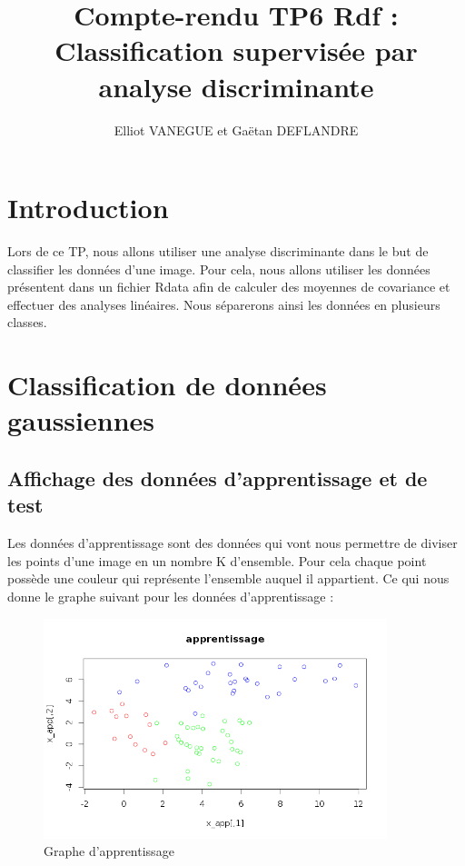 \documentclass[a4paper,11pt]{article}
\title{Compte-rendu TP6 Rdf : Classification supervisée par analyse discriminante}
\author{Elliot VANEGUE et Gaëtan DEFLANDRE}
\begin{document}


  \maketitle
  
  \mbox{}
  \newpage
  \clearpage
  
  \section*{Introduction}
  Lors de ce TP, nous allons utiliser une analyse discriminante dans
  le but de classifier les données d'une image. Pour cela, nous allons
  utiliser les données présentent dans un fichier Rdata afin de
  calculer des moyennes de covariance et effectuer des analyses
  linéaires. Nous séparerons ainsi les données en plusieurs classes.

  \section{Classification de données gaussiennes}
  \subsection{Affichage des données d'apprentissage et de test}
  Les données d'apprentissage sont des données qui vont nous permettre
  de diviser les points d'une image en un nombre K d'ensemble. Pour
  cela chaque point possède une couleur qui représente l'ensemble
  auquel il appartient.  Ce qui nous donne le graphe suivant pour les
  données d'apprentissage :
  
  \begin{figure}[H]
   \centering
   \includegraphics[width=10cm]{ensemble_apprentissage.png}
   \caption{Graphe d'apprentissage}
  \end{figure}
\end{document}
